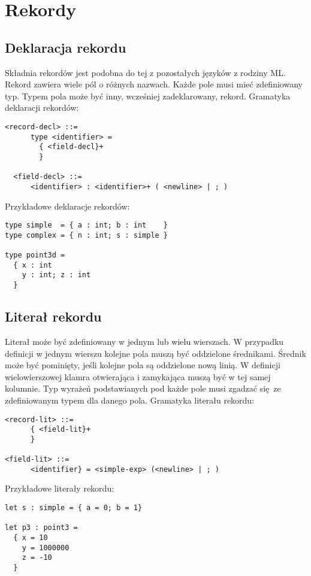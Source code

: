 \documentclass[declaration,shortabstract]{iithesis}
\begin{document}
\section{Rekordy}

\subsection{Deklaracja rekordu}

Składnia rekordów jest podobna do tej z pozostałych języków z rodziny ML. 
Rekord zawiera wiele pól o różnych nazwach. Każde pole musi mieć zdefiniowany 
typ. Typem pola może być inny, wcześniej zadeklarowany, rekord.
Gramatyka deklaracji rekordów:
\begin{lstlisting}[frame=lines]
  <record-decl> ::=
      type <identifier> =
        { <field-decl}+ 
        }
  
  <field-decl> ::=
      <identifier> : <identifier>+ ( <newline> | ; )
\end{lstlisting}

Przykładowe deklaracje rekordów:
\begin{lstlisting}[frame=lines]
type simple  = { a : int; b : int    }
type complex = { n : int; s : simple }

type point3d = 
  { x : int 
    y : int; z : int 
  }
\end{lstlisting}

\subsection{Literał rekordu}

Literał może być zdefiniowany w jednym lub wielu wierszach. W przypadku 
definicji w jednym wierszu kolejne pola muszą być oddzielone średnikami. 
Średnik może być pominięty, jeśli kolejne pola są oddzielone nową linią. 
W definicji wielowierszowej klamra otwierająca i zamykająca muszą być w tej 
samej kolumnie. Typ wyrażeń podstawianych pod każde pole musi zgadzać się ze 
zdefiniowanym typem dla danego pola. 
Gramatyka literału rekordu:
\begin{lstlisting}[frame=lines]
<record-lit> ::=
      { <field-lit}+
      }

<field-lit> ::=
      <identifier} = <simple-exp> (<newline> | ; )
\end{lstlisting}
\pagebreak
Przykładowe literały rekordu:

\begin{lstlisting}[frame=lines]
let s : simple = { a = 0; b = 1}

let p3 : point3 = 
  { x = 10
    y = 1000000 
    z = -10 
  }
\end{lstlisting}
\end{document}
